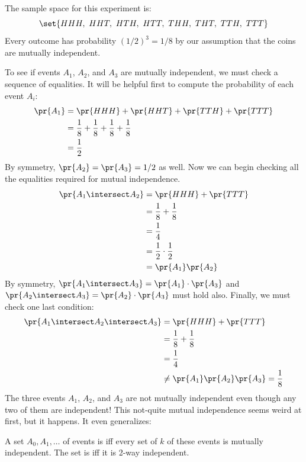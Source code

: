 The sample space for this experiment is:
%
\[
\set{HHH,\ HHT,\ HTH,\ HTT,\ THH,\ THT,\ TTH,\ TTT}
\]
%
Every outcome has probability $(1/2)^3 = 1/8$ by our assumption that
the coins are mutually independent.

To see if events $A_1$, $A_2$, and $A_3$ are mutually independent, we
must check a sequence of equalities.  It will be helpful first to
compute the probability of each event $A_i$:
%
\begin{align*}
\pr{A_1} & = \pr{HHH} + \pr{HHT} + \pr{TTH} + \pr{TTT} \\
         & = \frac{1}{8} + \frac{1}{8} + \frac{1}{8} + \frac{1}{8}\\
         & = \frac{1}{2}
\end{align*}
%
By symmetry, $\pr{A_2} = \pr{A_3} = 1/2$ as well.  Now we can begin
checking all the equalities required for mutual independence.
%
\begin{align*}
\pr{A_1 \intersect A_2}
	& = \pr{HHH} + \pr{TTT} \\
        & = \frac{1}{8} + \frac{1}{8} \\
        & = \frac{1}{4} \\
        & = \frac{1}{2} \cdot \frac{1}{2}\\
        & = \pr{A_1} \pr{A_2}
\end{align*}
%
By symmetry, $\pr{A_1 \intersect A_3} = \pr{A_1} \cdot \pr{A_3}$ and
$\pr{A_2 \intersect A_3} = \pr{A_2} \cdot \pr{A_3}$ must hold also.
Finally, we must check one last condition:
%
\begin{align*}
\pr{A_1 \intersect A_2 \intersect A_3}      & = \pr{HHH} + \pr{TTT} \\
                                & = \frac{1}{8} + \frac{1}{8} \\
                                & = \frac{1}{4} \\
                                & \neq \pr{A_1} \pr{A_2} \pr{A_3} = \frac{1}{8}
\end{align*}
%
The three events $A_1$, $A_2$, and $A_3$ are not mutually independent
even though any two of them are independent!  This not-quite
mutual independence seems weird at first, but it happens.   It even generalizes:

\begin{definition}\label{kway_independent_events}
  A set $A_0,A_1,\dots$ of events is  iff every
  set of $k$ of these events is mutually independent.  The set is
   iff it is 2-way independent.
\end{definition}

